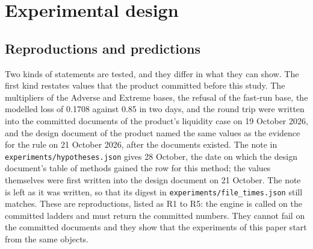\section{Experimental design}
\label{sec:experimental-design}

\subsection{Reproductions and predictions}

Two kinds of statements are tested, and they differ in what they can show. The first kind restates values that the product committed before this study. The multipliers of the Adverse and Extreme bases, the refusal of the fast-run base, the modelled loss of 0.1708 against 0.85 in two days, and the round trip were written into the committed documents of the product's liquidity case on 19 October 2026, and the design document of the product named the same values as the evidence for the rule on 21 October 2026, after the documents existed. The note in \texttt{experiments/hypotheses.json} gives 28 October, the date on which the design document's table of methods gained the row for this method; the values themselves were first written into the design document on 21 October. The note is left as it was written, so that its digest in \texttt{experiments/file\_times.json} still matches. These are reproductions, listed as R1 to R5: the engine is called on the committed ladders and must return the committed numbers. They cannot fail on the committed documents and they show that the experiments of this paper start from the same objects.

